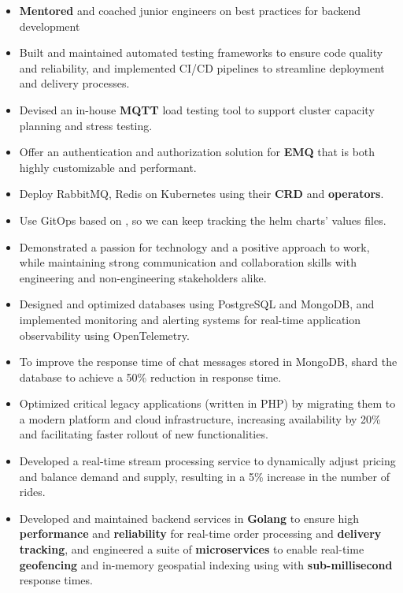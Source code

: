 \vspace{0.5cm}
\begin{itemize}
  \item \textbf{Mentored} and coached junior engineers on best practices for backend development
  \item Built and maintained automated testing frameworks to ensure code quality and reliability,
    and implemented CI/CD pipelines to streamline deployment and delivery processes.
  \item Devised an in-house \textbf{MQTT} load testing tool to support cluster capacity planning and stress testing.
  \item Offer an authentication and authorization solution for \textbf{EMQ} that is both highly customizable and performant.
  \item Deploy RabbitMQ, Redis on Kubernetes using their \textbf{CRD} and \textbf{operators}.
  \item Use GitOps based on , so we can keep tracking the helm charts' values files.
  \item Demonstrated a passion for technology and a positive approach to work,
    while maintaining strong communication and collaboration skills with engineering
    and non-engineering stakeholders alike.
  \item Designed and optimized databases using PostgreSQL and MongoDB,
    and implemented monitoring and alerting systems for real-time application observability using OpenTelemetry.
  \item To improve the response time of chat messages stored in MongoDB, shard the database to achieve a 50\% reduction in response time.
\end{itemize}

\vspace{1cm}

\vspace{0.5cm}
\begin{itemize}
  \item Optimized critical legacy applications (written in PHP) by migrating them to a modern platform and cloud infrastructure,
    increasing availability by 20\% and facilitating faster rollout of new functionalities.
  \item Developed a real-time stream processing service to dynamically adjust pricing and balance demand and supply,
    resulting in a 5\% increase in the number of rides.
  \item Developed and maintained backend services in \textbf{Golang} to ensure
    high \textbf{performance} and \textbf{reliability} for real-time order processing and \textbf{delivery tracking},
    and engineered a suite of \textbf{microservices} to enable real-time \textbf{geofencing} and in-memory geospatial
    indexing using  with \textbf{sub-millisecond} response times.
\end{itemize}

